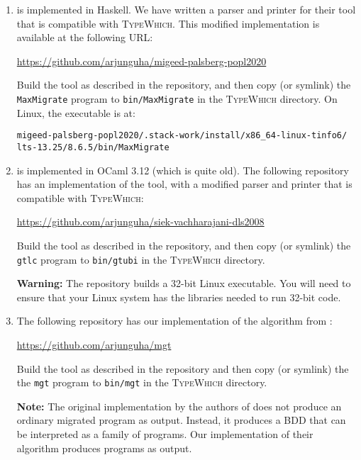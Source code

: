 \documentclass{book}
\newcommand{\system}{\textsc{TypeWhich}\xspace}
\begin{document}
\begin{enumerate}

\item \citet{migeed:decidable} is implemented in Haskell. We have written a
parser and printer for their tool that is compatible with \system. This
modified implementation is available at the following URL:

\url{https://github.com/arjunguha/migeed-palsberg-popl2020}

Build the tool as described in the repository, and then copy (or symlink) the
\texttt{MaxMigrate} program to \texttt{bin/MaxMigrate} in the \system
directory. On Linux, the executable is at:

\begin{verbatim}
migeed-palsberg-popl2020/.stack-work/install/x86_64-linux-tinfo6/
lts-13.25/8.6.5/bin/MaxMigrate
\end{verbatim}

\item \citet{siek:gti} is implemented in OCaml 3.12 (which is quite old).
The following repository has an implementation of the tool, with a modified
parser and printer that is compatible with \system:

\url{https://github.com/arjunguha/siek-vachharajani-dls2008}

Build the tool as described in the repository, and then copy (or symlink)
the \texttt{gtlc} program to \texttt{bin/gtubi} in the \system directory.

\textbf{Warning:} The repository builds a 32-bit Linux executable. You will
need to ensure that your Linux system has the libraries needed to run 32-bit
code.

\item \citet{campora:migrating} The following repository has our implementation
of the algorithm from \citet{campora:migrating}:
   
\url{https://github.com/arjunguha/mgt}

Build the tool as described in the repository and then copy (or symlink) the
the \texttt{mgt} program to \texttt{bin/mgt} in the \system directory.

\textbf{Note:} The original implementation by the authors of \citet{campora:migrating}
does not produce an ordinary migrated program as output. Instead, it produces a
BDD that can be interpreted as a family of programs. Our implementation of
their algorithm produces programs as output.

\end{enumerate}
\end{document}
